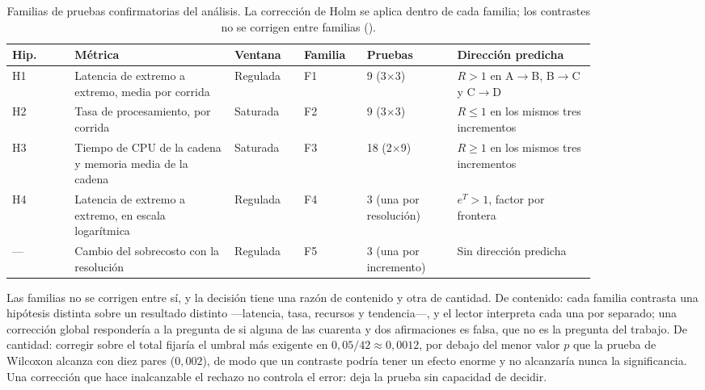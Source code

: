 \begin{table}[htbp]
  \centering
  \caption[Familias de pruebas confirmatorias]{Familias de pruebas
  confirmatorias del análisis. La corrección de Holm se aplica dentro de cada
  familia; los contrastes no se corrigen entre familias
  ().}
  \label{tab:analysis-families}
  \begin{tabular}{@{}L{0.09\linewidth}L{0.23\linewidth}L{0.10\linewidth}L{0.09\linewidth}L{0.13\linewidth}L{0.20\linewidth}@{}}
    \toprule
    \textbf{Hip.} & \textbf{Métrica} & \textbf{Ventana} &
    \textbf{Familia} & \textbf{Pruebas} & \textbf{Dirección predicha} \\
    \midrule
    H1 & Latencia de extremo a extremo, media por corrida & Regulada & F1 &
    9 (3$\times$3) & $R>1$ en A$\to$B, B$\to$C y C$\to$D \\
    H2 & Tasa de procesamiento, por corrida & Saturada & F2 & 9 (3$\times$3) &
    $R\le 1$ en los mismos tres incrementos \\
    H3 & Tiempo de CPU de la cadena y memoria media de la cadena &
    Saturada & F3 & 18 (2$\times$9) & $R\ge 1$ en los mismos tres
    incrementos \\
    H4 & Latencia de extremo a extremo, en escala logarítmica & Regulada &
    F4 & 3 (una por resolución) & $e^{T}>1$, factor por frontera \\
    --- & Cambio del sobrecosto con la resolución & Regulada & F5 &
    3 (una por incremento) & Sin dirección predicha \\
    \bottomrule
  \end{tabular}
\end{table}

Las familias no se corrigen entre sí, y la decisión tiene una razón de
contenido y otra de cantidad. De contenido: cada familia contrasta una
hipótesis distinta sobre un resultado distinto ---latencia, tasa, recursos y
tendencia---, y el lector interpreta cada una por separado; una corrección
global respondería a la pregunta de si alguna de las cuarenta y dos
afirmaciones es falsa, que no es la pregunta del trabajo. De cantidad:
corregir sobre el total fijaría el umbral más exigente en
$0{,}05/42\approx0{,}0012$, por debajo del menor valor $p$ que la prueba de
Wilcoxon alcanza con diez pares ($0{,}002$), de modo que un contraste podría
tener un efecto enorme y no alcanzaría nunca la significancia. Una corrección
que hace inalcanzable el rechazo no controla el error: deja la prueba sin
capacidad de decidir.

